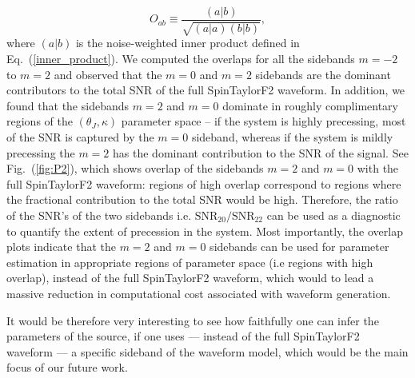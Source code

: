 \begin{equation} 
O_{ab} \equiv \dfrac{(a|b)}{\sqrt{(a|a)(b|b)}},
\end{equation} 
where $(a|b)$ is the noise-weighted inner product defined in
Eq.~(\ref{inner_product}). We computed the overlaps for all the sidebands $m=-2$
to $m=2$ and observed that the $m=0$ and  $m=2$ sidebands are the dominant
contributors to the total SNR of the full SpinTaylorF2 waveform. In addition, we
found  that the sidebands $m=2$ and $m=0$ dominate in roughly complimentary
regions of the  $(\theta_J, \kappa)$ parameter space -- if the system is highly
precessing, most of the SNR is captured by the $m=0$ sideband, whereas if the
system is mildly precessing the $m=2$ has the dominant contribution to the SNR of
the signal. See Fig.~(\ref{fig:P2}), which shows overlap  of the sidebands $m=2$
and $m=0$ with the full SpinTaylorF2 waveform: regions of high overlap
correspond to regions where the fractional contribution  to the total SNR would
be high. Therefore, the ratio of the SNR's of the two sidebands i.e.
$\text{SNR}_{20}/\text{SNR}_{22}$ can be used as a diagnostic to quantify the
extent of precession in the system. Most importantly, the overlap plots indicate
that the $m=2$ and $m=0$ sidebands can be used for parameter estimation in
appropriate regions of parameter space (i.e regions with high overlap), instead
of the full SpinTaylorF2 waveform, which would to lead a massive reduction in
computational cost associated with waveform generation. 

It would be therefore very interesting to see how faithfully one can infer the parameters of the source, 
if one uses --- instead of the full SpinTaylorF2 waveform --- a specific sideband of the waveform model, 
which would be the main focus of our future work.

